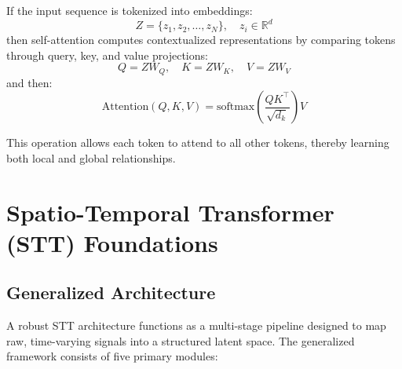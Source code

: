 \documentclass[12pt, a4paper]{report}
\begin{document}
If the input sequence is tokenized into embeddings:
$$
Z = \{z_1, z_2, \dots, z_N\}, \quad z_i \in \mathbb{R}^{d}
$$
then self-attention computes contextualized representations by comparing tokens through query, key, and value projections:
$$
Q = ZW_Q,\quad K = ZW_K,\quad V = ZW_V
$$
and then:
$$
\text{Attention}(Q,K,V) = \text{softmax}\left(\frac{QK^\top}{\sqrt{d_k}}\right)V
$$

This operation allows each token to attend to all other tokens, thereby learning both local and global relationships.


\section{Spatio-Temporal Transformer (STT) Foundations}

\subsection{Generalized Architecture}
A robust STT architecture functions as a multi-stage pipeline designed to map raw, time-varying signals into a structured latent space. The generalized framework consists of five primary modules:
\end{document}
